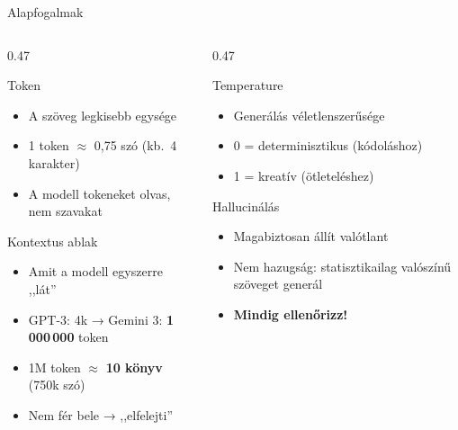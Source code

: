 \documentclass[aspectratio=169, 12pt]{beamer}
\begin{document}
\begin{frame}{Alapfogalmak}
  \footnotesize
  \begin{columns}[T,onlytextwidth]
    \begin{column}{0.47\textwidth}
      \begin{block}{Token}
        \begin{itemize}\setlength{\itemsep}{1pt}
          \item A szöveg legkisebb egysége
          \item 1 token $\approx$ 0,75 szó (kb.\ 4 karakter)
          \item A modell tokeneket olvas, nem szavakat
        \end{itemize}
      \end{block}
      \begin{block}{Kontextus ablak}
        \begin{itemize}\setlength{\itemsep}{1pt}
          \item Amit a modell egyszerre ,,lát''
          \item GPT-3: 4k → Gemini 3: \textbf{1\,000\,000} token
          \item 1M token $\approx$ \textbf{10 könyv} (750k szó)
          \item Nem fér bele → ,,elfelejti''
        \end{itemize}
      \end{block}
    \end{column}
    \begin{column}{0.47\textwidth}
      \begin{block}{Temperature}
        \begin{itemize}\setlength{\itemsep}{1pt}
          \item Generálás véletlenszerűsége
          \item 0 = determinisztikus (kódoláshoz)
          \item 1 = kreatív (ötleteléshez)
        \end{itemize}
      \end{block}
      \begin{alertblock}{Hallucinálás}
        \begin{itemize}\setlength{\itemsep}{1pt}
          \item Magabiztosan állít valótlant
          \item Nem hazugság: statisztikailag valószínű szöveget generál
          \item \textbf{Mindig ellenőrizz!}
        \end{itemize}
      \end{alertblock}
    \end{column}
  \end{columns}
\end{frame}
\end{document}
